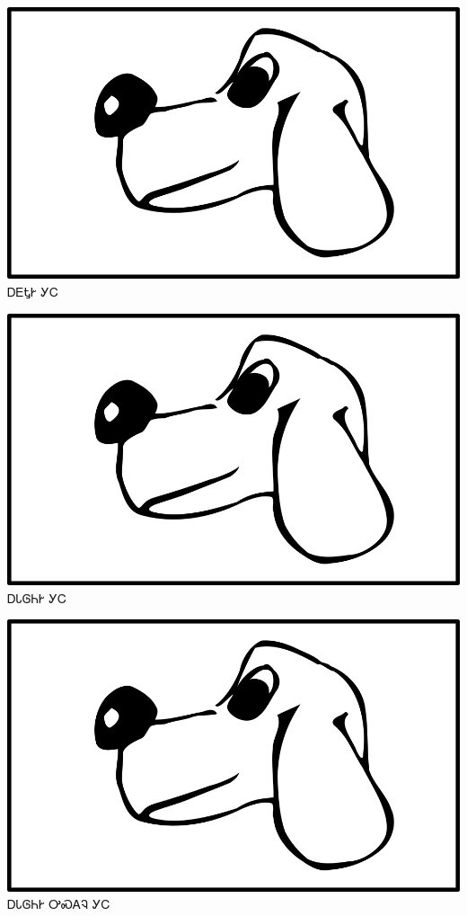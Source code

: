 \documentclass[avery5371]{flashcards}%
\begin{document}
    \begin{flashcard}{
        \includegraphics[width=0.95\columnwidth,height=.51\columnwidth,keepaspectratio]{../artwork/for-colors/gihli}
    }
        \Huge ᎠᎬᎿᎨ ᎩᏟ
    \end{flashcard}

    \begin{flashcard}{
        \includegraphics[width=0.95\columnwidth,height=.51\columnwidth,keepaspectratio]{../artwork/for-colors/gihli}
    }
        \Huge ᎠᏓᎶᏂᎨ ᎩᏟ
    \end{flashcard}

    \begin{flashcard}{
        \includegraphics[width=0.95\columnwidth,height=.51\columnwidth,keepaspectratio]{../artwork/for-colors/gihli}
    }
        \Huge ᎠᏓᎶᏂᎨ ᎤᏍᎪᎸ ᎩᏟ
    \end{flashcard}
\end{document}
